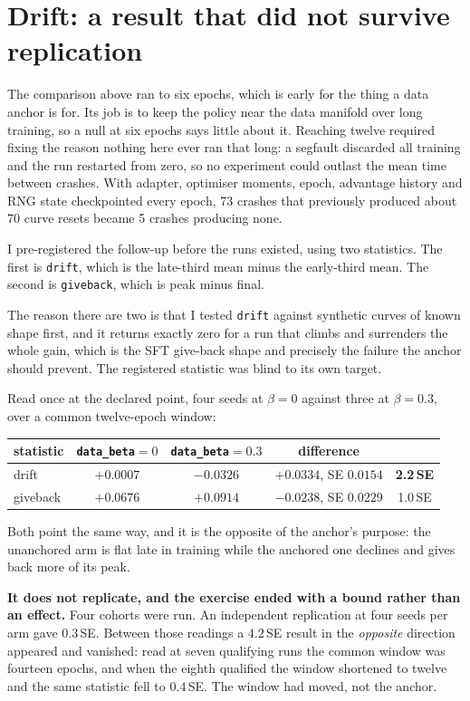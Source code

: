 \documentclass[11pt]{article}
\newcommand{\code}[1]{\texttt{\small #1}}
\begin{document}
\section{Drift: a result that did not survive replication}

The comparison above ran to six epochs, which is early for the thing a data anchor is for. Its job is to keep the policy near the data manifold over long training, so a null at six epochs says little about it. Reaching twelve required fixing the reason nothing here ever ran that long: a segfault discarded all training and the run restarted from zero, so no experiment could outlast the mean time between crashes. With adapter, optimiser moments, epoch, advantage history and RNG state checkpointed every epoch, 73 crashes that previously produced about 70 curve resets became 5 crashes producing none.

I pre-registered the follow-up before the runs existed, using two statistics. The first is \code{drift}, which is the late-third mean minus the early-third mean. The second is \code{giveback}, which is peak minus final.

The reason there are two is that I tested \code{drift} against synthetic curves of known shape first, and it returns exactly zero for a run that climbs and surrenders the whole gain, which is the SFT give-back shape and precisely the failure the anchor should prevent. The registered statistic was blind to its own target.

Read once at the declared point, four seeds at $\beta{=}0$ against three at $\beta{=}0.3$, over a common twelve-epoch window:

\begin{center}
\begin{tabular}{lcccc}
\toprule
statistic & \code{data\_beta}$=0$ & \code{data\_beta}$=0.3$ & difference & \\
\midrule
drift & $+0.0007$ & $-0.0326$ & $+0.0334$, SE $0.0154$ & \textbf{2.2\,SE} \\
giveback & $+0.0676$ & $+0.0914$ & $-0.0238$, SE $0.0229$ & 1.0\,SE \\
\bottomrule
\end{tabular}
\end{center}

\noindent Both point the same way, and it is the opposite of the anchor's purpose: the unanchored arm is flat late in training while the anchored one declines and gives back more of its peak.

\textbf{It does not replicate, and the exercise ended with a bound rather than an effect.} Four cohorts were run. An independent replication at four seeds per arm gave $0.3$\,SE. Between those readings a $4.2$\,SE result in the \emph{opposite} direction appeared and vanished: read at seven qualifying runs the common window was fourteen epochs, and when the eighth qualified the window shortened to twelve and the same statistic fell to $0.4$\,SE. The window had moved, not the anchor.
\end{document}
